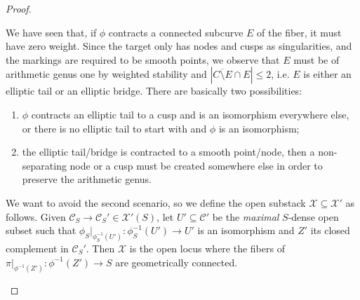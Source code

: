 \documentclass[11pt]{amsart}
\renewcommand{\to}{\rightarrow}
\theoremstyle{plain}
\theoremstyle{definition}
\begin{document}
\begin{proof}
\begin{description}[labelindent=0cm,leftmargin=\parindent]
\item[Step 4] We have seen that, if $\phi$ contracts a connected subcurve $E$ of the fiber, it must have zero weight. Since the target only has nodes and cusps as singularities, and the markings are required to be smooth points, we observe that $E$ must be of arithmetic genus one by weighted stability and $|\overline{C\setminus E}\cap E|\leq 2$, i.e. $E$ is either an elliptic tail or an elliptic bridge. There are basically two possibilities:
\begin{enumerate}
\item $\phi$ contracts an elliptic tail to a cusp and is an isomorphism everywhere else, or there is no elliptic tail to start with and $\phi$ is an isomorphism;
\item the elliptic tail/bridge is contracted to a smooth point/node, then a non-separating node or a cusp must be created somewhere else in order to preserve the arithmetic genus.
\end{enumerate} 
We want to avoid the second scenario, so we define the open substack $\mathcal X\subseteq \mathcal X'$ as follows.
Given $\mathcal{C}_S\to\mathcal C_S'\in\mathcal X'(S)$, let $U'\subseteq \mathcal C'$ be the \emph{maximal} $S$-dense open subset such that $\phi_S|_{\phi_S^{-1}(U')}\colon\phi_S^{-1}(U')\to U'$ is an isomorphism and $Z'$ its closed complement in $\mathcal C_S'$. 
Then $\mathcal X$ is the open locus \cite[\href{http://stacks.math.columbia.edu/tag/055G}{Tag 055G}]{stacks-project} where the fibers of $\pi|_{\phi^{-1}(Z')}\colon \phi^{-1}(Z')\to S$ are geometrically connected.
\end{description} 
 \end{proof}
 
\end{document}
